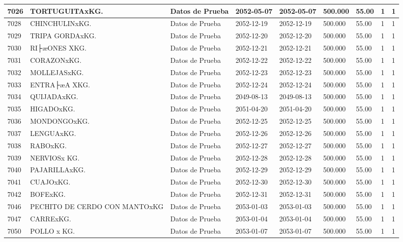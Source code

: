 \documentclass[a4paper,12pt]{article}
\begin{document}
\begin{landscape}
\begin{longtable}{|p{4cm}|p{2.5cm}|p{2.5cm}|p{1.8cm}|p{1.8cm}|p{1cm}|p{1cm}|p{3cm}|p{3cm}||}
7026 & TORTUGUITAxKG. & Datos de Prueba & 2052-05-07 & 2052-05-07 & 500.000 & 55.00 & 1 & 1 \\ \hline 
7028 & CHINCHULINxKG. & Datos de Prueba & 2052-12-19 & 2052-12-19 & 500.000 & 55.00 & 1 & 1 \\ \hline 
7029 & TRIPA GORDAxKG. & Datos de Prueba & 2052-12-20 & 2052-12-20 & 500.000 & 55.00 & 1 & 1 \\ \hline 
7030 & RI├æONES XKG. & Datos de Prueba & 2052-12-21 & 2052-12-21 & 500.000 & 55.00 & 1 & 1 \\ \hline 
7031 & CORAZONxKG. & Datos de Prueba & 2052-12-22 & 2052-12-22 & 500.000 & 55.00 & 1 & 1 \\ \hline 
7032 & MOLLEJASxKG. & Datos de Prueba & 2052-12-23 & 2052-12-23 & 500.000 & 55.00 & 1 & 1 \\ \hline 
7033 & ENTRA├æA XKG. & Datos de Prueba & 2052-12-24 & 2052-12-24 & 500.000 & 55.00 & 1 & 1 \\ \hline 
7034 & QUIJADAxKG. & Datos de Prueba & 2049-08-13 & 2049-08-13 & 500.000 & 55.00 & 1 & 1 \\ \hline 
7035 & HIGADOxKG. & Datos de Prueba & 2051-04-20 & 2051-04-20 & 500.000 & 55.00 & 1 & 1 \\ \hline 
7036 & MONDONGOxKG. & Datos de Prueba & 2052-12-25 & 2052-12-25 & 500.000 & 55.00 & 1 & 1 \\ \hline 
7037 & LENGUAxKG. & Datos de Prueba & 2052-12-26 & 2052-12-26 & 500.000 & 55.00 & 1 & 1 \\ \hline 
7038 & RABOxKG. & Datos de Prueba & 2052-12-27 & 2052-12-27 & 500.000 & 55.00 & 1 & 1 \\ \hline 
7039 & NERVIOSx KG. & Datos de Prueba & 2052-12-28 & 2052-12-28 & 500.000 & 55.00 & 1 & 1 \\ \hline 
7040 & PAJARILLAxKG. & Datos de Prueba & 2052-12-29 & 2052-12-29 & 500.000 & 55.00 & 1 & 1 \\ \hline 
7041 & CUAJOxKG. & Datos de Prueba & 2052-12-30 & 2052-12-30 & 500.000 & 55.00 & 1 & 1 \\ \hline 
7042 & BOFExKG. & Datos de Prueba & 2052-12-31 & 2052-12-31 & 500.000 & 55.00 & 1 & 1 \\ \hline 
7046 & PECHITO DE CERDO CON MANTOxKG & Datos de Prueba & 2053-01-03 & 2053-01-03 & 500.000 & 55.00 & 1 & 1 \\ \hline 
7047 & CARRExKG. & Datos de Prueba & 2053-01-04 & 2053-01-04 & 500.000 & 55.00 & 1 & 1 \\ \hline 
7050 & POLLO x  KG. & Datos de Prueba & 2053-01-07 & 2053-01-07 & 500.000 & 55.00 & 1 & 1 \\ \hline 

\end{longtable}
\end{landscape}
\end{document}
